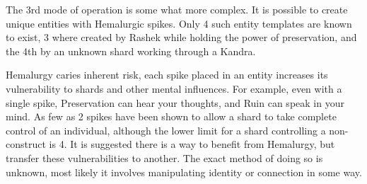 \documentclass[conference]{IEEEtran}
\begin{document}
The 3rd mode of operation is some what more complex.  It is possible to create unique entities with Hemalurgic spikes.\cite{WoF}  Only 4 such entity templates are known to exist, 3 where created by Rashek while holding the power of preservation,\cite{WoF} and the 4th by an unknown shard working through a Kandra.\cite{SoS-CH21} 

Hemalurgy caries inherent risk, each spike placed in an entity increases its vulnerability to shards and other mental influences.\cite{HE-Shard}\cite{HoA-CH58}\cite{HoA-CH13}\cite{HoA-CH77}  For example, even with a single spike, Preservation can hear your thoughts,\cite{SoS-CH7} and Ruin can speak in your mind.\cite{HoA-CH65}  As few as 2 spikes have been shown to allow a shard to take complete control of an individual,\cite{SoS-CH7} although the lower limit for a shard controlling a non-construct is 4.\cite{BoM-CH27}  It is suggested there is a way to benefit from Hemalurgy, but transfer these vulnerabilities to another.\cite{BoM-CH27}  The exact method of doing so is unknown, most likely it involves manipulating identity or connection in some way.
\end{document}
